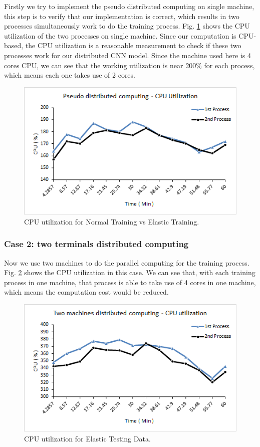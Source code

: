 Firstly we try to implement the pseudo distributed computing on single machine, this step is to verify that our implementation is correct, which results in two processes simultaneously work to do the training process. Fig. \ref{CPU utilization in case 1} shows the CPU utilization of the two processes on single machine. Since our computation is CPU-based, the CPU utilization is a reasonable measurement to check if these two processes work for our distributed CNN model. Since the machine used here is 4 cores CPU, we can see that the working utilization is near 200\% for each process, which means each one takes use of 2 cores.


\begin {figure}[t]
\centering
\includegraphics[width=0.9\columnwidth]{Paper_Fig12_CPU_Case1.png} %
\caption{CPU utilization for Normal Training vs Elastic Training.}
\label{CPU utilization in case 1}
\end {figure}

\subsubsection*{Case 2: two terminals distributed computing}

Now we use two machines to do the parallel computing for the training process. Fig. \ref{CPU utilization in case 2} shows the CPU utilization in this case. We can see that, with each training process in one machine, that process is able to take use of 4 cores in one machine, which means the computation cost would be reduced.

\begin {figure}[t]
\centering
\includegraphics[width=0.9\columnwidth]{Paper_Fig13_CPU_Case2.png} %
\caption{CPU utilization for Elastic Testing Data.}
\label{CPU utilization in case 2}
\end {figure}

